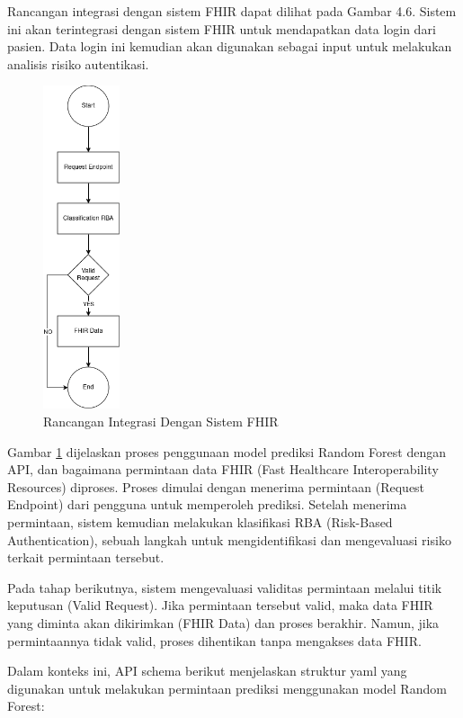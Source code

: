 Rancangan integrasi dengan sistem FHIR dapat dilihat pada Gambar 4.6. Sistem ini akan terintegrasi dengan sistem FHIR untuk mendapatkan data login dari pasien. Data login ini kemudian akan digunakan sebagai input untuk melakukan analisis risiko autentikasi.
\begin{figure}[H]
    \centering
    \includegraphics[width=0.2\textwidth]{BAB_TESIS/IMAGES/fhir_rba.drawio.png}
    \caption{Rancangan Integrasi Dengan Sistem FHIR}
    \label{fig:integrasi}
\end{figure}

Gambar \ref{fig:integrasi} dijelaskan proses penggunaan model prediksi Random Forest dengan API, dan bagaimana permintaan data FHIR (Fast Healthcare Interoperability Resources) diproses. Proses dimulai dengan menerima permintaan (Request Endpoint) dari pengguna untuk memperoleh prediksi. Setelah menerima permintaan, sistem kemudian melakukan klasifikasi RBA (Risk-Based Authentication), sebuah langkah untuk mengidentifikasi dan mengevaluasi risiko terkait permintaan tersebut.

Pada tahap berikutnya, sistem mengevaluasi validitas permintaan melalui titik keputusan (Valid Request). Jika permintaan tersebut valid, maka data FHIR yang diminta akan dikirimkan (FHIR Data) dan proses berakhir. Namun, jika permintaannya tidak valid, proses dihentikan tanpa mengakses data FHIR.

Dalam konteks ini, API schema berikut menjelaskan struktur yaml yang digunakan untuk melakukan permintaan prediksi menggunakan model Random Forest:

